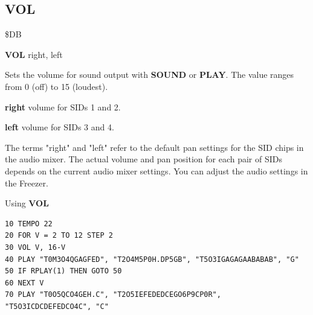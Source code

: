 \subsection{VOL}
\begin{description}[leftmargin=2cm,style=nextline]
\item [Token:]    \$DB

\item [Format:]   {\bf VOL} right, left

\item [Usage:]    Sets the volume for sound output with {\bf SOUND} or {\bf PLAY}. The value ranges from 0 (off) to 15 (loudest).

                  {\bf right} volume for SIDs 1 and 2.

                  {\bf left} volume for SIDs 3 and 4.

\item [Remarks:]  The terms "right" and "left" refer to the default pan settings for the SID chips in the audio mixer. The actual volume and pan position for each pair of SIDs depends on the current audio mixer settings. You can adjust the audio settings in the Freezer.

\item [Example:]  Using {\bf VOL}

\begin{tcolorbox}[colback=black,coltext=white]
\verbatimfont{\codefont}
\begin{verbatim}
10 TEMPO 22
20 FOR V = 2 TO 12 STEP 2
30 VOL V, 16-V
40 PLAY "T0M3O4QGAGFED", "T2O4M5P0H.DP5GB", "T5O3IGAGAGAABABAB", "G"
50 IF RPLAY(1) THEN GOTO 50
60 NEXT V
70 PLAY "T0O5QCO4GEH.C", "T2O5IEFEDEDCEGO6P9CP0R", "T5O3ICDCDEFEDCO4C", "C"
\end{verbatim}
\end{tcolorbox}
\end{description}


\newpage
